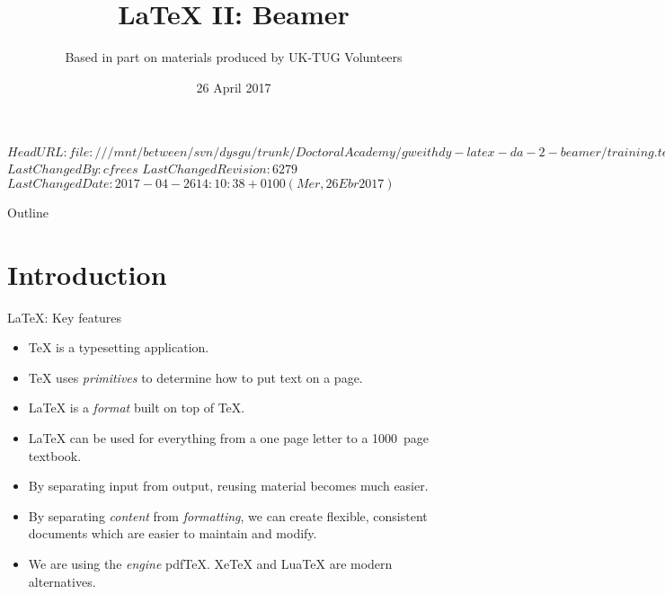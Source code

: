 \svnidlong
{$HeadURL: file:///mnt/between/svn/dysgu/trunk/DoctoralAcademy/gweithdy-latex-da-2-beamer/training.tex $}
{$LastChangedBy: cfrees $}
{$LastChangedRevision: 6279 $}
{$LastChangedDate: 2017-04-26 14:10:38 +0100 (Mer, 26 Ebr 2017) $}



\title{\LaTeX{} II: Beamer}
\subtitle{Based in part on materials produced by UK-TUG Volunteers}
\date{ 26 April 2017}

{
}
{
  \newcolumntype{q}{l}
}




\begin{frame}
  \titlepage
\end{frame}

\maketitle


\tableofcontents

%
{
  \begin{frame}{Outline}
	\tableofcontents
  \end{frame}
}

%

\section{Introduction}

\begin{frame}{\LaTeX{}: Key features}

  \begin{itemize}
	\item \TeX{} is a typesetting application.
	\item \TeX{} uses \emph{primitives} to determine how to put text on a page.
	\item \LaTeX{} is  a \emph{format} built on top of \TeX{}.
	\item \LaTeX{} can be used for everything from a one page letter to a 1000~page textbook.
	\item By separating input from output, reusing material becomes much easier.
	\item By separating \emph{content} from \emph{formatting}, we can create flexible, consistent documents which are easier to maintain and modify.
	\item We are using the \emph{engine} pdf\TeX{}.
	Xe\TeX{} and Lua\TeX{} are modern alternatives.
  \end{itemize}

\end{frame}

